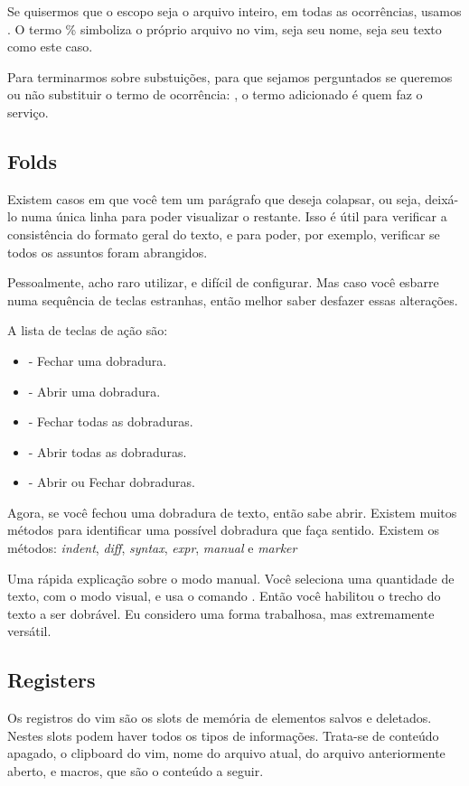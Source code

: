 \documentclass[a4paper, 12pt]{article}
\begin{document}
Se quisermos que o escopo seja o arquivo inteiro, em todas as ocorrências, usamos .
O termo \% simboliza o próprio arquivo no vim, seja seu nome, seja seu texto como este caso.

Para terminarmos sobre substuições, para que sejamos perguntados se queremos ou não substituir o termo de ocorrência:
, o termo  adicionado é quem faz o serviço.

\subsection{Folds}
Existem casos em que você tem um parágrafo que deseja colapsar, ou seja, deixá-lo numa única linha para poder visualizar o restante.
Isso é útil para verificar a consistência do formato geral do texto, e para poder, por exemplo, verificar se todos os assuntos foram abrangidos.

Pessoalmente, acho raro utilizar, e difícil de configurar.
Mas caso você esbarre numa sequência de teclas estranhas, então melhor saber desfazer essas alterações.

A lista de teclas de ação são:
\begin{itemize}
    \item {} - Fechar uma dobradura.
    \item {} - Abrir uma dobradura.
    \item {} - Fechar todas as dobraduras.
    \item {} - Abrir todas as dobraduras.
    \item {} - Abrir ou Fechar dobraduras.
\end{itemize}

Agora, se você fechou uma dobradura de texto, então sabe abrir.
Existem muitos métodos para identificar uma possível dobradura que faça sentido.
Existem os métodos: \textit{indent}, \textit{diff}, \textit{syntax}, \textit{expr}, \textit{manual} e \textit{marker}

Uma rápida explicação sobre o modo manual.
Você seleciona uma quantidade de texto, com o modo visual, e usa o comando .
Então você habilitou o trecho do texto a ser dobrável.
Eu considero uma forma trabalhosa, mas extremamente versátil.

\subsection{Registers}
Os registros do vim são os slots de memória de elementos salvos e deletados.
Nestes slots podem haver todos os tipos de informações.
Trata-se de conteúdo apagado, o clipboard do vim, nome do arquivo atual, do arquivo anteriormente aberto,
e macros, que são o conteúdo a seguir.
\end{document}
